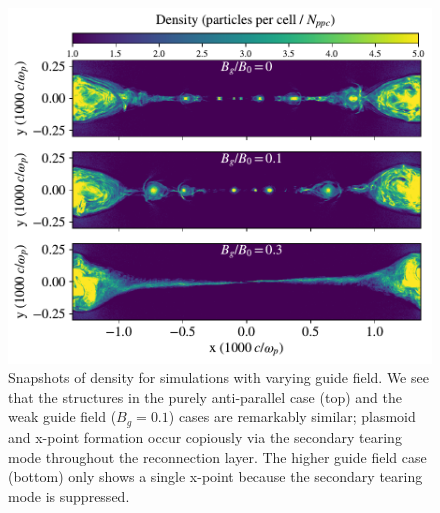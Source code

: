 \documentclass[iop,twocolappendix]{emulateapj}
\begin{document}
\begin{figure}[htp] 
	\includegraphics[width=\linewidth]{flds_compare.pdf}
	\caption{Snapshots of density for simulations with varying guide field.  We see that the structures in the purely anti-parallel case (top) and the weak guide field ($B_{g}=0.1$) cases are remarkably similar; plasmoid and x-point formation occur copiously via the secondary tearing mode throughout the reconnection layer.  The higher guide field case (bottom) only shows a single x-point because the secondary tearing mode is suppressed.}
	\label{bg_flds_compare}
\end{figure}

\FloatBarrier



\end{document}
